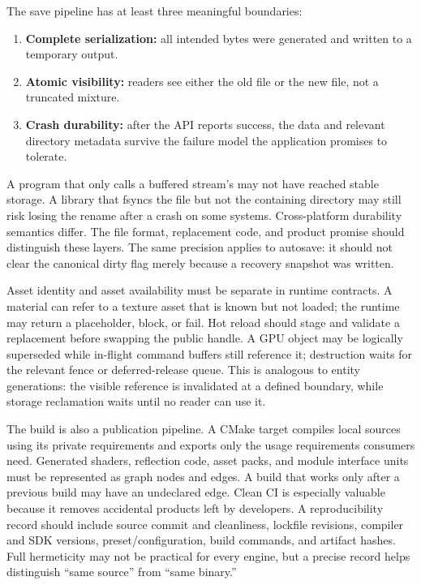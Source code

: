 The save pipeline has at least three meaningful boundaries:

\begin{enumerate}
\def\labelenumi{\arabic{enumi}.}
\tightlist
\item
  \textbf{Complete serialization:} all intended bytes were generated and written to a temporary output.
\item
  \textbf{Atomic visibility:} readers see either the old file or the new file, not a truncated mixture.
\item
  \textbf{Crash durability:} after the API reports success, the data and relevant directory metadata survive the failure model the application promises to tolerate.
\end{enumerate}

A program that only calls a buffered stream's  may not have reached stable storage. A library that fsyncs the file but not the containing directory may still risk losing the rename after a crash on some systems. Cross-platform durability semantics differ. The file format, replacement code, and product promise should distinguish these layers. The same precision applies to autosave: it should not clear the canonical dirty flag merely because a recovery snapshot was written.

Asset identity and asset availability must be separate in runtime contracts. A material can refer to a texture asset that is known but not loaded; the runtime may return a placeholder, block, or fail. Hot reload should stage and validate a replacement before swapping the public handle. A GPU object may be logically superseded while in-flight command buffers still reference it; destruction waits for the relevant fence or deferred-release queue. This is analogous to entity generations: the visible reference is invalidated at a defined boundary, while storage reclamation waits until no reader can use it.

The build is also a publication pipeline. A CMake target compiles local sources using its private requirements and exports only the usage requirements consumers need. Generated shaders, reflection code, asset packs, and module interface units must be represented as graph nodes and edges. A build that works only after a previous build may have an undeclared edge. Clean CI is especially valuable because it removes accidental products left by developers. A reproducibility record should include source commit and cleanliness, lockfile revisions, compiler and SDK versions, preset/configuration, build commands, and artifact hashes. Full hermeticity may not be practical for every engine, but a precise record helps distinguish ``same source'' from ``same binary.''


